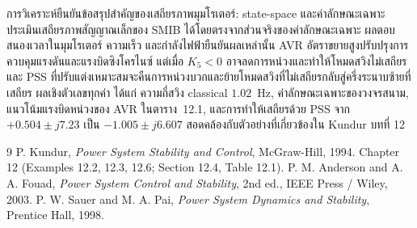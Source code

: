 \documentclass[12pt,a4paper]{article}
\begin{document}
การวิเคราะห์ยืนยันข้อสรุปสำคัญของเสถียรภาพมุมโรเตอร์:
state-space และค่าลักษณะเฉพาะประเมินเสถียรภาพสัญญาณเล็กของ SMIB ได้โดยตรงจากส่วนจริงของค่าลักษณะเฉพาะ
ผลตอบสนองเวลาในมุมโรเตอร์ ความเร็ว และกำลังไฟฟ้ายืนยันผลเหล่านั้น
AVR อัตราขยายสูงปรับปรุงการควบคุมแรงดันและแรงบิดซิงโครไนซ์
แต่เมื่อ $K_5<0$ อาจลดการหน่วงและทำให้โหมดสวิงไม่เสถียร
และ PSS ที่ปรับแต่งเหมาะสมจะคืนการหน่วงบวกและย้ายโหมดสวิงที่ไม่เสถียรกลับสู่ครึ่งระนาบซ้ายที่เสถียร
ผลเชิงตัวเลขทุกค่า ได้แก่ ความถี่สวิง classical $1.02$~Hz,
ค่าลักษณะเฉพาะของวงจรสนาม, แนวโน้มแรงบิดหน่วงของ AVR ในตาราง~12.1,
และการทำให้เสถียรด้วย PSS จาก $+0.504\pm j7.23$ เป็น $-1.005\pm j6.607$
สอดคล้องกับตัวอย่างที่เกี่ยวข้องใน Kundur บทที่ 12

\begin{thebibliography}{9}
 P. Kundur, \textit{Power System Stability and Control},
McGraw-Hill, 1994. Chapter 12 (Examples 12.2, 12.3, 12.6; Section 12.4,
Table 12.1).
 P. M. Anderson and A. A. Fouad, \textit{Power System Control
and Stability}, 2nd ed., IEEE Press / Wiley, 2003.
 P. W. Sauer and M. A. Pai, \textit{Power System Dynamics and
Stability}, Prentice Hall, 1998.
\end{thebibliography}
\end{document}
